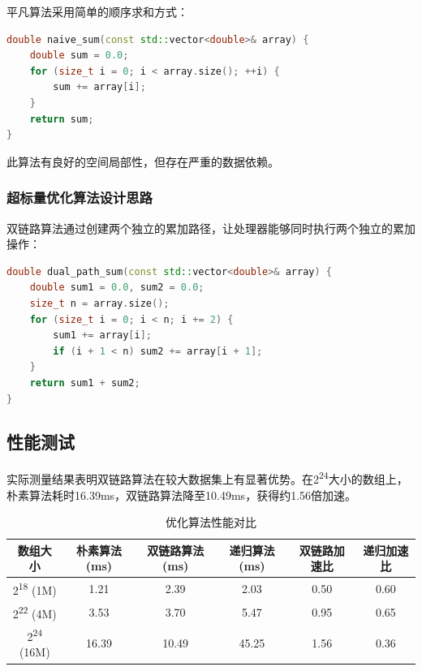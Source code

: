 \documentclass[a4paper,colorlinks=true,linkcolor=blue,urlcolor=blue,citecolor=green,bookmarks=true]{article}
\begin{document}
平凡算法采用简单的顺序求和方式：

\begin{lstlisting}[language=C++]
double naive_sum(const std::vector<double>& array) {
    double sum = 0.0;
    for (size_t i = 0; i < array.size(); ++i) {
        sum += array[i];
    }
    return sum;
}
\end{lstlisting}

此算法有良好的空间局部性，但存在严重的数据依赖。

\subsubsection{超标量优化算法设计思路}

双链路算法通过创建两个独立的累加路径，让处理器能够同时执行两个独立的累加操作：

\begin{lstlisting}[language=C++]
double dual_path_sum(const std::vector<double>& array) {
    double sum1 = 0.0, sum2 = 0.0;
    size_t n = array.size();
    for (size_t i = 0; i < n; i += 2) {
        sum1 += array[i];
        if (i + 1 < n) sum2 += array[i + 1];
    }
    return sum1 + sum2;
}
\end{lstlisting}

\subsection{性能测试}

实际测量结果表明双链路算法在较大数据集上有显著优势。在2\textsuperscript{24}大小的数组上，朴素算法耗时16.39ms，双链路算法降至10.49ms，获得约1.56倍加速。

\begin{table}[htbp]
\centering
\caption{优化算法性能对比}
\label{tab:opt_sum_perf}
\begin{tabular}{|c|c|c|c|c|c|}
\hline
\textbf{数组大小} & \textbf{朴素算法(ms)} & \textbf{双链路算法(ms)} & \textbf{递归算法(ms)} & \textbf{双链路加速比} & \textbf{递归加速比} \\
\hline
2\textsuperscript{18} (1M) & 1.21 & 2.39 & 2.03 & 0.50 & 0.60 \\
\hline
2\textsuperscript{22} (4M) & 3.53 & 3.70 & 5.47 & 0.95 & 0.65 \\
\hline
2\textsuperscript{24} (16M) & 16.39 & 10.49 & 45.25 & 1.56 & 0.36 \\
\hline
\end{tabular}
\end{table}
\end{document}
